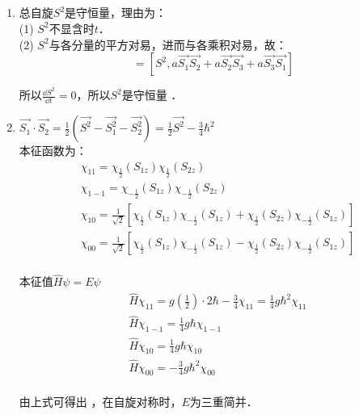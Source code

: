 \subsection{ }
\begin{enumerate}
\item 总自旋$S^2$是守恒量，理由为：\\
(1) $S^2$不显含时$t$．\\
(2) $S^2$与各分量的平方对易，进而与各乘积对易，故：\\
\begin{equation}
[S^2 ,H^2] = [S^2 , a \vec{S_1} \vec{S_2} + a \vec{S_2} \vec{S_3} + a \vec{S_3} \vec{S_1}]
\end{equation}

所以$\frac{\dd{S^2}}{\dd{t}}=0$，所以$S^2$是守恒量 ．

\item $\displaystyle \vec{S_1} \cdot \vec{S_2} = \frac{1}{2} (\vec{S^2} -\vec{S^2_1} -\vec{S^2_2}) = \frac{1}{2} \vec{S^2} - \frac{3}{4} \hbar^2 $ \\

本征函数为：\\
\begin{equation}
\begin{aligned}
& \chi_{11} = \chi_{\frac{1}{2}}(S_{1z})\chi_{\frac{1}{2}}(S_{2z}) \\
& \chi_{1-1} = \chi_{-\frac{1}{2}}(S_{1z})\chi_{-\frac{1}{2}}(S_{2z}) \\
& \chi_{10} = \frac{1}{\sqrt{2}} \left[ \chi_{\frac{1}{2}}(S_{1z})\chi_{-\frac{1}{2}}(S_{1z}) + \chi_{\frac{1}{2}}(S_{2z})\chi_{-\frac{1}{2}}(S_{1z}) \right] \\
& \chi_{00} = \frac{1}{\sqrt{2}} \left[ \chi_{\frac{1}{2}}(S_{1z})\chi_{-\frac{1}{2}}(S_{1z}) - \chi_{\frac{1}{2}}(S_{2z})\chi_{-\frac{1}{2}}(S_{1z}) \right]  \\
\end{aligned}
\end{equation}

本征值$\hat{H}\psi = E\psi $ \\
\begin{equation}
\begin{aligned}
& \hat{H}\chi_{11} = g(\frac{1}{2}) \cdot 2\hbar - \frac{3}{4} \chi_{11} = \frac{1}{4}g\hbar^{2} \chi_{11}  \\
& \hat{H}\chi_{1-1} = \frac{1}{4}g\hbar \chi_{1-1}  \\
& \hat{H}\chi_{10} = \frac{1}{4}g\hbar \chi_{10}  \\
& \hat{H}\chi_{00} = -\frac{3}{4}g\hbar^{2} \chi_{00}  \\
\end{aligned}
\end{equation}

由上式可得出 ，在自旋对称时，$E$为三重简并．
\end{enumerate}
